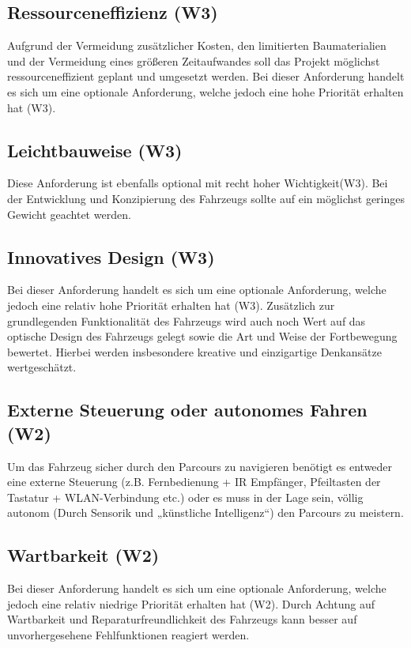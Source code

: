 \subsection*{Ressourceneffizienz (W3)}
Aufgrund der Vermeidung zusätzlicher Kosten, den limitierten Baumaterialien und der Vermeidung eines größeren Zeitaufwandes soll das Projekt möglichst ressourceneffizient geplant und umgesetzt werden. Bei dieser Anforderung handelt es sich um eine optionale Anforderung, welche jedoch eine hohe Priorität erhalten hat (W3).

\subsection*{Leichtbauweise (W3)}
Diese Anforderung ist ebenfalls optional mit recht hoher Wichtigkeit(W3). Bei der Entwicklung und Konzipierung des Fahrzeugs sollte auf ein möglichst geringes Gewicht geachtet werden.

\subsection*{Innovatives Design (W3)}
Bei dieser Anforderung handelt es sich um eine optionale Anforderung, welche jedoch eine relativ hohe Priorität erhalten hat (W3). Zusätzlich zur grundlegenden Funktionalität des Fahrzeugs wird auch noch Wert auf das optische Design des Fahrzeugs gelegt sowie die Art und Weise der Fortbewegung bewertet. Hierbei werden insbesondere kreative und einzigartige Denkansätze wertgeschätzt.

\subsection*{Externe Steuerung oder autonomes Fahren (W2)}
Um das Fahrzeug sicher durch den Parcours zu navigieren benötigt es entweder eine externe Steuerung (z.B. Fernbedienung + IR Empfänger, Pfeiltasten der Tastatur + WLAN-Verbindung etc.) oder es muss in der Lage sein, völlig autonom (Durch Sensorik und „künstliche Intelligenz“) den Parcours zu meistern.

\subsection*{Wartbarkeit (W2)}
Bei dieser Anforderung handelt es sich um eine optionale Anforderung, welche jedoch eine relativ niedrige Priorität erhalten hat (W2). Durch Achtung auf Wartbarkeit und Reparaturfreundlichkeit des Fahrzeugs kann besser auf unvorhergesehene Fehlfunktionen reagiert werden.

